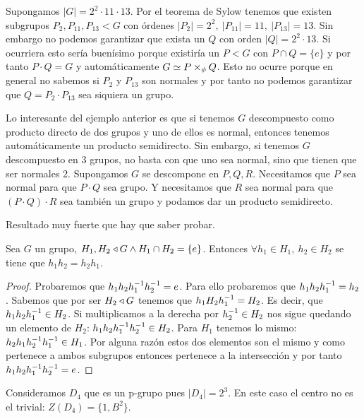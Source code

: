 
\begin{ej}
	Supongamos $|G| = 2^2 \cdot 11 \cdot 13$. Por el teorema de Sylow tenemos que existen subgrupos $P_2, P_{11}, P_{13} < G$ con órdenes $|P_2| = 2^2,\ |P_{11}| = 11,\ |P_{13}| = 13$. Sin embargo no podemos garantizar que exista un $Q$ con orden $|Q| = 2^2 \cdot 13$. Si ocurriera esto sería buenísimo porque existiría un $P < G$ con $P \cap Q = \{e\}$ y por tanto $P\cdot Q = G$ y automáticamente $G \simeq P \times_{\phi} Q$. Esto no ocurre porque en general no sabemos si $P_2$ y $P_13$ son normales y por tanto no podemos garantizar que $Q = P_2 \cdot P_13$ sea siquiera un grupo.
	
	Lo interesante del ejemplo anterior es que si tenemos $G$ descompuesto como producto directo de dos grupos y uno de ellos es normal, entonces tenemos automáticamente un producto semidirecto. Sin embargo, si tenemos $G$ descompuesto en 3 grupos, no basta con que uno sea normal, sino que tienen que ser normales 2. Supongamos $G$ se descompone en $P,Q,R$. Necesitamos que $P$ sea normal para que $P\cdot Q$ sea grupo. Y necesitamos que $R$ sea normal para que $(P\cdot Q) \cdot R$ sea también un grupo y podamos dar un producto semidirecto.
\end{ej}



Resultado muy fuerte que hay que saber probar.

\begin{thm}
	\label{thm:interseccionneutroconmutan}
	Sea $G$ un grupo, $H_1, H_2 \mathbin{\triangleleft} G \land H_1 \cap H_2 = \{e\}$. Entonces $\forall h_1 \in H_1,\ h_2 \in H_2$ se tiene que $h_1 h_2 = h_2 h_1$.
\end{thm}

\begin{proof}
	Probaremos que $h_1 h_2 h_1^{-1} h_2^{-1} = e$. Para ello probaremos que $h_1 h_2 h_1^{-1} = h_2$. Sabemos que por ser $H_2 \mathbin{\triangleleft} G$ tenemos que $h_1 H_2 h_1^{-1} = H_2$. Es decir, que $h_1 h_2 h_1^{-1} \in H_2$. Si multiplicamos a la derecha por $h_2^{-1} \in H_2$ nos sigue quedando un elemento de $H_2$: $h_1 h_2 h_1^{-1} h_2^{-1} \in H_2$. Para $H_1$ tenemos lo mismo: $h_2 h_1 h_2^{-1} h_1^{-1} \in H_1$. Por alguna razón estos dos elementos son el mismo y como pertenece a ambos subgrupos entonces pertenece a la intersección y por tanto $h_1 h_2 h_1^{-1} h_2^{-1} = e$.
\end{proof}

\begin{ej}
	Consideramos $D_4$ que es un p-grupo pues $|D_4| = 2^3$. En este caso el centro no es el trivial: $Z(D_4) = \{1, B^2\}$.
\end{ej}

